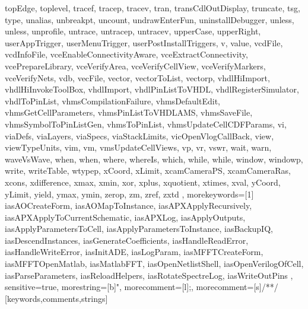 {{topEdge, toplevel, tracef, tracep, tracev, tran, transCdlOutDisplay, truncate, tsg, type, unalias, unbreakpt, uncount, undrawEnterFun, uninstallDebugger, unless, unless, unprofile, untrace, untracep, untracev, upperCase, upperRight, userAppTrigger, userMenuTrigger, userPostInstallTriggers, v, value, vcdFile, vcdInfoFile, vceEnableConnectivityAware, vceExtractConnectivity, vcePrepareLibrary, vceVerifyArea, vceVerifyCellView, vceVerifyMarkers, vceVerifyNets, vdb, vecFile, vector, vectorToList, vectorp, vhdlHiImport, vhdlHiInvokeToolBox, vhdlImport, vhdlPinListToVHDL, vhdlRegisterSimulator, vhdlToPinList, vhmsCompilationFailure, vhmsDefaultEdit, vhmsGetCellParameters, vhmsPinListToVHDLAMS, vhmsSaveFile, vhmsSymbolToPinListGen, vhmsToPinList, vhmsUpdateCellCDFParams, vi, viaDefs, viaLayers, viaSpecs, viaStackLimits, vicOpenVlogCallBack, view, viewTypeUnits, vim, vm, vmsUpdateCellViews, vp, vr, vswr, wait, warn, waveVsWave, when, when, where, whereIs, which, while, while, window, windowp, write, writeTable, wtypep, xCoord, xLimit, xcamCameraPS, xcamCameraRas, xcons, xdifference, xmax, xmin, xor, xplus, xquotient, xtimes, xval, yCoord, yLimit, yield, ymax, ymin, zerop, zm, zref, zxtd%
	},
	morekeywords=[1]{%
		iasAOCreateForm, iasAOMapToInstance, iasAPXApplyRecursively, iasAPXApplyToCurrentSchematic, iasAPXLog, iasApplyOutputs, iasApplyParametersToCell, iasApplyParametersToInstance, iasBackupIQ, iasDescendInstances, iasGenerateCoefficients, iasHandleReadError, iasHandleWriteError, iasInitADE, iasLogParam, iasMFFTCreateForm, iasMFFTOpenMatlab, iasMatlabFFT, iasOpenNetlistShell, iasOpenVerilogOfCell, iasParseParameters, iasReloadHelpers, iasRotateSpectreLog, iasWriteOutPins %
	},
	sensitive=true,
	morestring=[b]",
	morecomment=[l]{;},
	morecomment=[s]{/*}{*/}
}[keywords,comments,strings]